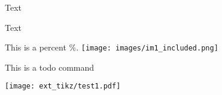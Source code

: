 Text

Text%


This is a percent \%.
\texttt{[image: images/im1\_included.png]}

This is a todo command


\newif\ifvar

\ifvar
\fi



\texttt{[image: ext\_tikz/test1.pdf]}




